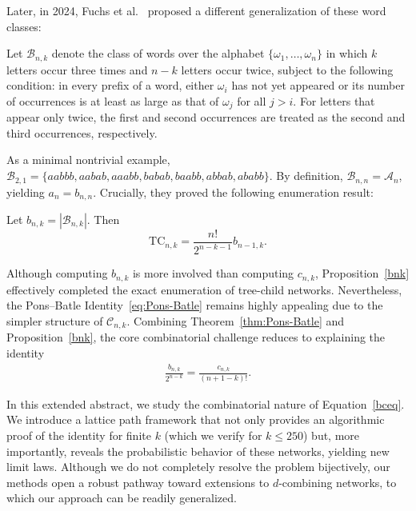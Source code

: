 \documentclass[a4paper,UKenglish,cleveref, autoref, thm-restate]{lipics-v2021}
\begin{document}
Later, in 2024, Fuchs et al.~\cite{Changetal2023dcombining} proposed a different generalization of these word classes:

\begin{definition}\label{bnkd}
Let $\mathcal{B}_{n,k}$ denote the class of words over the alphabet $\{\omega_1, \dots, \omega_n\}$ in which $k$ letters occur three times and $n-k$ letters occur twice, subject to the following condition: in every prefix of a word, either $\omega_i$ has not yet appeared or its number of occurrences is at least as large as that of $\omega_j$ for all $j>i$. For letters that appear only twice, the first and second occurrences are treated as the second and third occurrences, respectively.
\end{definition}

As a minimal nontrivial example, $\mathcal{B}_{2,1} = \{aabbb, aabab, aaabb, babab, baabb, abbab, ababb\}$.
By definition, $\mathcal{B}_{n,n} = \mathcal{A}_n$, yielding $a_n = b_{n,n}$. Crucially, they proved the following enumeration result:

\begin{proposition}\label{bnk}
Let $b_{n,k} = |\mathcal{B}_{n,k}|$. Then
\[
\mathrm{TC}_{n,k} = \frac{n!}{2^{n-k-1}} b_{n-1,k}.
\]
\end{proposition}

Although computing $b_{n,k}$ is more involved than computing $c_{n,k}$, Proposition~\ref{bnk} effectively completed the exact enumeration of tree-child networks. Nevertheless, the Pons--Batle Identity~\eqref{eq:Pons-Batle} remains highly appealing due to the simpler structure of $\mathcal{C}_{n,k}$. Combining Theorem~\ref{thm:Pons-Batle} and Proposition~\ref{bnk}, the core combinatorial challenge reduces to explaining the identity
\begin{align}\label{bceq}
    \frac{b_{n,k}}{2^{n-k}} = \frac{c_{n,k}}{(n+1-k)!}.
\end{align}

In this extended abstract, we study the combinatorial nature of Equation~\eqref{bceq}. We introduce a lattice path framework that not only provides an algorithmic proof of the identity for finite $k$ (which we verify for $k \leq 250$) but, more importantly, reveals the probabilistic behavior of these networks, yielding new limit laws. Although we do not completely resolve the problem bijectively, our methods open a robust pathway toward extensions to $d$-combining networks, to which our approach can be readily generalized.
\end{document}
